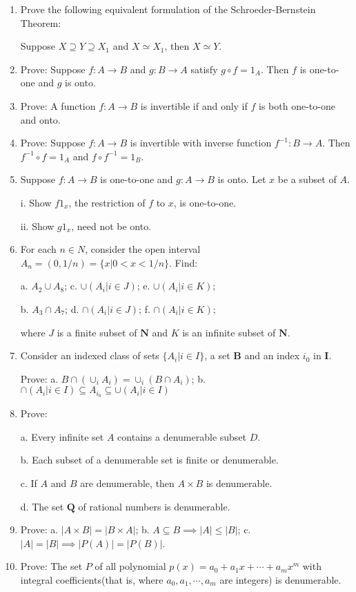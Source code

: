 \documentclass{article}
\begin{document}
\begin{enumerate}
    \item Prove the following equivalent formulation of the Schroeder-Bernstein Theorem:

    Suppose $X\supseteq Y \supseteq X_1$ and $X\simeq X_1$, then $X\simeq Y$.

    \item Prove: Suppose $f: A \to B$ and $g: B \to A$ satisfy $g\circ f = 1_A$. Then $f$ is one-to-one and $g$ is onto.

    \item Prove: A function $f: A\to B$ is invertible if and only if $f$ is both one-to-one and onto.

    \item Prove: Suppose $f: A\to B$ is invertible with inverse function $f^{-1}: B\to A$.
    Then $f^{-1}\circ f = 1_A$ and $f\circ f^{-1} = 1_B$.

    \item Suppose $f: A\to B$ is one-to-one and $g: A\to B$ is onto. Let $x$ be a subset of $A$.

    i. Show $f 1_x$, the restriction of $f$ to $x$, is one-to-one.

    ii. Show $g 1_x$, need not be onto.

    \item For each $n \in N$, consider the open interval $A_n = (0, 1/n) = \{x | 0 < x < 1/n\}$. Find:

    a. $A_2 \cup A_8$; c. $\cup(A_i | i \in J)$; e. $\cup(A_i | i \in K)$;

    b. $A_3 \cap A_7$; d. $\cap(A_i | i \in J)$; f. $\cap(A_i | i \in K)$;

    where $J$ is a finite subset of $\textbf{N}$ and $K$ is an infinite subset of $\textbf{N}$.

    \item Consider an indexed class of sets $\{A_i | i \in I\}$, a set $\textbf{B}$ and an index $i_0$ in $\textbf{I}$.

    Prove: a. $B\cap (\cup_i A_i) = \cup_i(B\cap A_i)$;
    b. $\cap(A_i | i \in I)\subseteq A_{i_0} \subseteq \cup (A_i | i \in I)$

    \item Prove:

    a. Every infinite set $A$ contains a denumerable subset $D$.

    b. Each subset of a denumerable set is finite or denumerable.

    c. If $A$ and $B$ are denumerable, then $A\times B$ is denumerable.

    d. The set $\textbf{Q}$ of rational numbers is denumerable.

    \item Prove: a. $|A\times B| = |B\times A|$;
    b. $A\subseteq B \implies |A| \leq |B|$;
    c. $|A| = |B| \implies |P(A)| = |P(B)|$.

    \item Prove: The set $P$ of all polynomial $p(x) = a_0 + a_1 x + \cdots + a_m x^m $
    with integral coefficients(that is, where $a_0, a_1, \cdots, a_m$ are integers) is denumerable.
  \end{enumerate}
\end{document}
